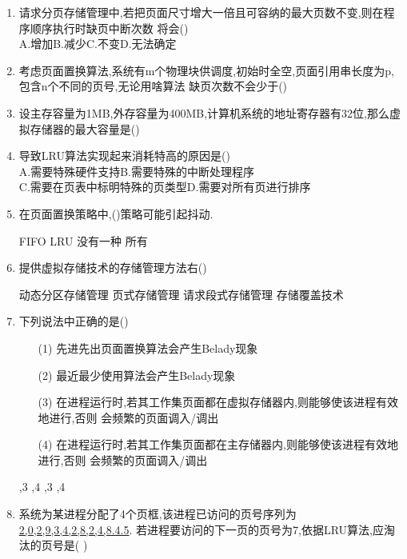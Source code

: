 \documentclass[12pt, a4paper, oneside, UTF8]{ctexbook}
\begin{document}
\begin{enumerate}
    \item 请求分页存储管理中,若把页面尺寸增大一倍且可容纳的最大页数不变,则在程序顺序执行时缺页中断次数
    将会() \\
    A.增加\qquad B.减少\qquad C.不变\qquad D.无法确定

    \item 考虑页面置换算法,系统有m个物理块供调度,初始时全空,页面引用串长度为p,包含n个不同的页号,无论用啥算法
    缺页次数不会少于()

    \item 设主存容量为1MB,外存容量为400MB,计算机系统的地址寄存器有32位,那么虚拟存储器的最大容量是() 

    \item 导致LRU算法实现起来消耗特高的原因是() \\
    A.需要特殊硬件支持\qquad B.需要特殊的中断处理程序 \\
    C.需要在页表中标明特殊的页类型\qquad D.需要对所有页进行排序

    \item 在页面置换策略中,()策略可能引起抖动. 
    \begin{choices}
        \task FIFO
        \task LRU
        \task 没有一种 
        \task 所有 
    \end{choices}

    \item 提供虚拟存储技术的存储管理方法右() 
    \begin{choices}[2]
        \task 动态分区存储管理
        \task 页式存储管理
        \task 请求段式存储管理
        \task 存储覆盖技术
    \end{choices}

    \item 下列说法中正确的是() 
    \begin{enumerate}
        \item [(1)] 先进先出页面置换算法会产生Belady现象
        \item [(2)] 最近最少使用算法会产生Belady现象
        \item [(3)] 在进程运行时,若其工作集页面都在虚拟存储器内,则能够使该进程有效地进行,否则
        会频繁的页面调入/调出
        \item [(4)] 在进程运行时,若其工作集页面都在主存储器内,则能够使该进程有效地进行,否则
        会频繁的页面调入/调出
    \end{enumerate}
    \begin{choices}
        ,3
        ,4
        ,3
        ,4
    \end{choices}

    \item \bl 系统为某进程分配了4个页框,该进程已访问的页号序列为\underline{2,0,2,9,3,4,2,8,2,4,8.4.5}.
    若进程要访问的下一页的页号为7,依据LRU算法,应淘汰的页号是(   ) 

\end{enumerate}
\end{document}

